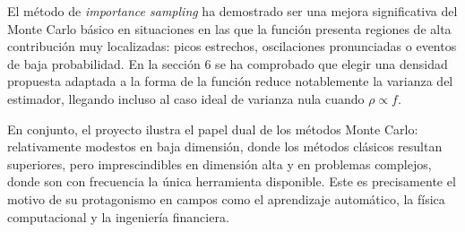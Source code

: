 \documentclass[11pt,a4paper]{article}
\begin{document}
El método de \emph{importance sampling} ha demostrado ser una mejora significativa del Monte Carlo básico en situaciones en las que la función presenta regiones de alta contribución muy localizadas: picos estrechos, oscilaciones pronunciadas o eventos de baja probabilidad. En la sección 6 se ha comprobado que elegir una densidad propuesta adaptada a la forma de la función reduce notablemente la varianza del estimador, llegando incluso al caso ideal de varianza nula cuando $\rho\propto f$.

En conjunto, el proyecto ilustra el papel dual de los métodos Monte Carlo: relativamente modestos en baja dimensión, donde los métodos clásicos resultan superiores, pero imprescindibles en dimensión alta y en problemas complejos, donde son con frecuencia la única herramienta disponible. Este es precisamente el motivo de su protagonismo en campos como el aprendizaje automático, la física computacional y la ingeniería financiera.
\end{document}
